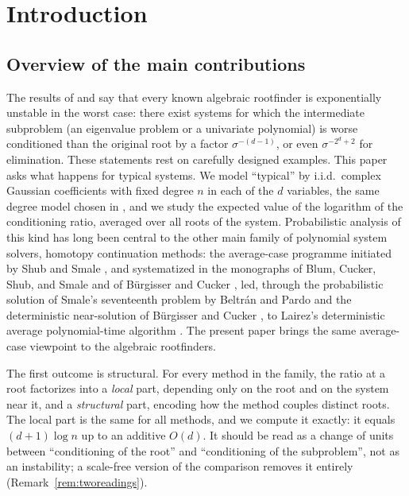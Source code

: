 \section{Introduction}\label{sec:intro}

\subsection{Overview of the main contributions}

The results of \cite{noferini2016numerical} and \cite{graf2026numerical} say that every known
algebraic rootfinder is exponentially unstable in the worst case: there exist systems for which
the intermediate subproblem (an eigenvalue problem or a univariate polynomial) is worse
conditioned than the original root by a factor $\sigma^{-(d-1)}$, or even $\sigma^{-2^d+2}$ for
elimination. These statements rest on carefully designed examples. This paper asks what happens
for typical systems. We model ``typical'' by i.i.d.\ complex Gaussian coefficients with fixed
degree $n$ in each of the $d$ variables, the same degree model chosen in
\cite{noferini2016numerical}, and we study the expected value of the logarithm of the
conditioning ratio, averaged over all roots of the system. Probabilistic analysis of this
kind has long been central to the other main family of polynomial system solvers, homotopy
continuation methods: the average-case programme initiated by Shub and Smale
\cite{shub1993complexity}, and systematized in the monographs of Blum, Cucker, Shub, and
Smale \cite{blum1998complexity} and of B\"urgisser and Cucker \cite{burgisser2013condition},
led, through the probabilistic solution of Smale's
seventeenth problem by Beltr\'an and Pardo \cite{beltran2009smale} and the deterministic
near-solution of B\"urgisser and Cucker \cite{burgisser2011smale}, to Lairez's
deterministic average polynomial-time algorithm \cite{lairez2017deterministic}. The present
paper brings the same average-case viewpoint to the algebraic rootfinders.

The first outcome is structural. For every method in the family, the ratio at a root factorizes
into a \emph{local} part, depending only on the root and on the system near it, and a
\emph{structural} part, encoding how the method couples distinct roots. The local part is the
same for all methods, and we compute it exactly: it equals $(d+1)\log n$ up to an additive
$O(d)$. It should be read as a change of units between ``conditioning of the root'' and
``conditioning of the subproblem'', not as an instability; a scale-free version of the
comparison removes it entirely (Remark~\ref{rem:tworeadings}).

